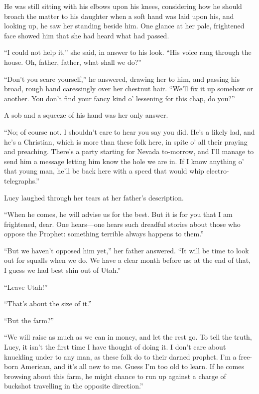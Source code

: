 \documentclass[12pt,english,oneside]{book}
\newcommand{\mdsh}[1]{\mbox{#1}\linebreak[1]}
\begin{document}
He was still sitting with his elbows upon his knees, considering how
he should broach the matter to his daughter when a soft hand was laid
upon his, and looking up, he saw her standing beside him. One glance
at her pale, frightened face showed him that she had heard what had
passed.

{}``I could not help it,'' she said, in answer to his look. {}``His
voice rang through the house. Oh, father, father, what shall we do?''

{}``Don't you scare yourself,'' he answered, drawing her to him,
and passing his broad, rough hand caressingly over her chestnut hair.
{}``We'll fix it up somehow or another. You don't find your fancy
kind o' lessening for this chap, do you?''

A sob and a squeeze of his hand was her only answer.

{}``No; of course not. I shouldn't care to hear you say you did.
He's a likely lad, and he's a Christian, which is more than these
folk here, in spite o' all their praying and preaching. There's a
party starting for Nevada to-morrow, and I'll manage to send him a
message letting him know the hole we are in. If I know anything o'
that young man, he'll be back here with a speed that would whip electro-telegraphs.''

Lucy laughed through her tears at her father's description.

{}``When he comes, he will advise us for the best. But it is for
you that I am frightened, dear. One hears\mdsh{---}one hears such
dreadful stories about those who oppose the Prophet: something terrible
always happens to them.''

{}``But we haven't opposed him yet,'' her father answered. {}``It
will be time to look out for squalls when we do. We have a clear month
before us; at the end of that, I guess we had best shin out of Utah.''

{}``Leave Utah!''

{}``That's about the size of it.''

{}``But the farm?''

{}``We will raise as much as we can in money, and let the rest go.
To tell the truth, Lucy, it isn't the first time I have thought of
doing it. I don't care about knuckling under to any man, as these
folk do to their darned prophet. I'm a free-born American, and it's
all new to me. Guess I'm too old to learn. If he comes browsing about
this farm, he might chance to run up against a charge of buckshot
travelling in the opposite direction.''
\end{document}
